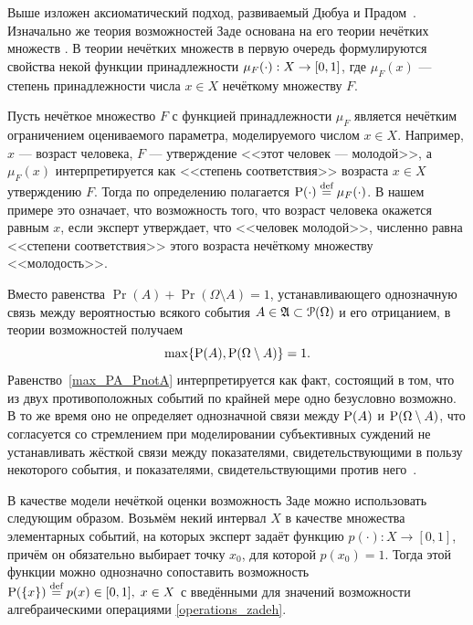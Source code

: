 \begin{notice}
Выше изложен аксиоматический подход, развиваемый Дюбуа и Прадом~\cite{dubois_prade-1990}. Изначально же теория возможностей Заде основана на его теории нечётких множеств \cite{ZadehPrime}. В теории нечётких множеств в первую очередь формулируются свойства некой функции принадлежности $\mu_{F}(\cdot): X \rightarrow \zo$, где $\mu_F(x)$ --- степень принадлежности числа $x \in X$ нечёткому множеству $F$. 

Пусть нечёткое множество $F$ с функцией принадлежности $\mu_{F}$ является нечётким ограничением \cite{citeZadeh} оцениваемого параметра, моделируемого числом $x \in X$. Например, $x$ --- возраст человека, $F$ --- утверждение <<этот человек --- молодой>>, а $\mu_{F}(x)$ интерпретируется как <<степень соответствия>> возраста $x \in X$ утверждению $F$. Тогда по определению полагается $\P(\cdot) \defeq \mu_{F}(\cdot)$. В нашем примере это означает, что возможность того, что возраст человека окажется равным $x$, если эксперт утверждает, что <<человек молодой>>, численно равна <<степени соответствия>> этого возраста нечёткому множеству <<молодость>>. 
\end{notice}
\begin{notice}
Вместо равенства $\Pr(A) + \Pr(\Omega\setminus A) = 1$, устанавливающего однозначную связь между вероятностью всякого события $A\in\Alg \subset \Po(\Omega)$ и его отрицанием, в теории возможностей получаем
\begin{equation}
\label{max_PA_PnotA}
    \max\{\P(A), \P(\Omega\setminus A)\} = 1.
\end{equation}
Равенство~\eqref{max_PA_PnotA} интерпретируется как факт, состоящий в том, что из двух противоположных событий по крайней мере одно безусловно возможно. В то же время оно не определяет однозначной связи между $\P(A)$ и $\P(\Omega\setminus A)$, что согласуется со стремлением при моделировании субъективных суждений не устанавливать жёсткой связи между показателями, свидетельствующими в пользу некоторого события, и показателями, свидетельствующими против него~\cite{dubois_prade-1990}.
\end{notice}

\label{zadeh_fuzzy_asset_alg}
В качестве модели нечёткой оценки возможность Заде можно использовать следующим образом. Возьмём некий интервал $X$ в качестве множества элементарных событий, на которых эксперт задаёт функцию $p(\cdot): X \rightarrow [0,1]$, причём он обязательно выбирает точку $x_0$, для которой $p(x_0) = 1$. Тогда этой функции можно однозначно сопоставить возможность $\P(\{x\}) \define= p(x) \in \zo,\; x\in X$ с введёнными для значений возможности алгебраическими операциями \eqref{operations_zadeh}. 

